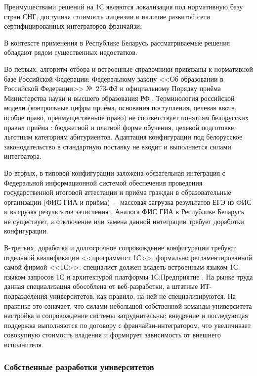 Преимуществами решений на 1С являются локализация под нормативную базу стран СНГ, доступная стоимость лицензии и наличие развитой сети сертифицированных интеграторов-франчайзи.

В контексте применения в Республике Беларусь рассматриваемые решения обладают рядом существенных недостатков.

Во-первых, алгоритм отбора и встроенные справочники привязаны к нормативной базе Российской Федерации: Федеральному закону <<Об образовании в Российской Федерации>> №~273-ФЗ и официальному Порядку приёма Министерства науки и высшего образования РФ .
Терминология российской модели (контрольные цифры приёма, основания поступления, целевая квота, особое право, преимущественное право) не соответствует понятиям белорусских правил приёма : бюджетной и платной форме обучения, целевой подготовке, льготным категориям абитуриентов.
Адаптация конфигурации под белорусское законодательство в стандартную поставку не входит и выполняется силами интегратора.

Во-вторых, в типовой конфигурации заложена обязательная интеграция с Федеральной информационной системой обеспечения проведения государственной итоговой аттестации и приёма граждан в образовательные организации (ФИС ГИА и приёма)~--~массовая загрузка результатов ЕГЭ из ФИС и выгрузка результатов зачисления .
Аналога ФИС ГИА в Республике Беларусь не существует, а отключение или замена данной интеграции требует доработки конфигурации.

В-третьих, доработка и долгосрочное сопровождение конфигурации требуют отдельной квалификации <<программист 1С>>, формально регламентированной самой фирмой <<1С>>: специалист должен владеть встроенным языком 1С, языком запросов 1С и архитектурой платформы 1С:Предприятие .
На рынке труда данная специализация обособлена от веб-разработки, а штатные ИТ-подразделения университетов, как правило, на ней не специализируются.
На практике это означает, что силами небольшой собственной команды университета настройка и сопровождение системы затруднительны: внедрение и последующая поддержка выполняются по договору с франчайзи-интегратором, что увеличивает совокупную стоимость владения и формирует зависимость от внешнего исполнителя.

\subsubsection{Собственные разработки университетов}

